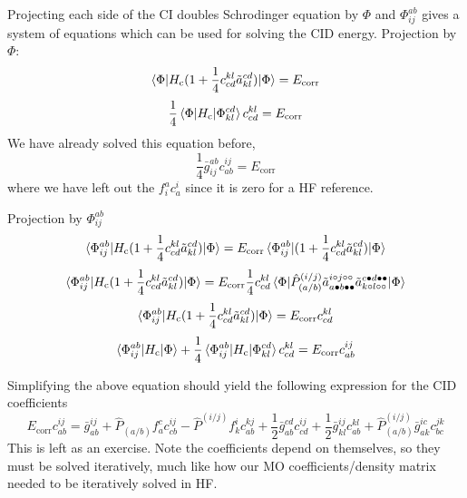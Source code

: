 \documentclass{article}
\newcommand{\h}{\circ}
\newcommand{\p}{\bullet}
\newcommand{\Ecorr}{E_{\mathrm{corr}}}
\newcommand{\Hc}{H_{\mathrm{c}}}
\begin{document}
Projecting each side of the CI doubles Schrodinger equation by $\Phi$ and $\Phi_{ij}^{ab}$ gives a system of equations 
which can be used for solving the CID energy.
Projection by $\Phi$:
\[\braket{\Phi |\Hc (1 + \frac{1}{4} c_{cd}^{kl} \tilde{a}_{kl}^{cd})| \Phi} = \Ecorr \]
\[ \frac{1}{4} \braket{\Phi |\Hc|\Phi_{kl}^{cd}} c_{cd}^{kl} = \Ecorr \]
We have already solved this equation before,
\[ \frac{1}{4} \bar{g}_{ij}^{ab} c_{ab}^{ij} = \Ecorr \]
where we have left out the $f_i^a c_a^i$ since it is zero for a HF reference.

Projection by $\Phi_{ij}^{ab}$
\[\braket{\Phi_{ij}^{ab} |\Hc (1 + \frac{1}{4} c_{cd}^{kl} \tilde{a}_{kl}^{cd})| \Phi} = \Ecorr \braket{\Phi_{ij}^{ab}| (1 + \frac{1}{4} c_{cd}^{kl} \tilde{a}_{kl}^{cd}) | \Phi} \]
\[\braket{\Phi_{ij}^{ab} |\Hc (1 + \frac{1}{4} c_{cd}^{kl} \tilde{a}_{kl}^{cd})| \Phi} 
          =  \Ecorr \frac{1}{4} c_{cd}^{kl} \braket{\Phi| \hat{P}_{(a/b)}^{(i/j)} \tilde{a}_{a \p b \p \p}^{i \h j \h \h}  \tilde{a}_{k \h l \h \h}^{c \p d \p \p} | \Phi} \]
\[\braket{\Phi_{ij}^{ab} |\Hc (1 + \frac{1}{4} c_{cd}^{kl} \tilde{a}_{kl}^{cd})| \Phi} 
          =  \Ecorr c_{cd}^{kl} \]
\[\braket{\Phi_{ij}^{ab} |\Hc | \Phi } + \frac{1}{4} \braket{\Phi_{ij}^{ab}| \Hc | \Phi_{kl}^{cd}} c_{cd}^{kl}
          =  \Ecorr c_{ab}^{ij} \]


Simplifying the above equation should yield the following expression for the
CID coefficients 
\[  \Ecorr c_{ab}^{ij} = \bar{g}_{ab}^{ij} + \hat{P}_{(a/b)} f_a^c c_{cb}^{ij} - \hat{P}^{(i/j)} f_k^i c_{ab}^{kj}
 + \frac{1}{2} \bar{g}_{ab}^{cd} c_{cd}^{ij} + \frac{1}{2} \bar{g}_{kl}^{ij} c_{ab}^{kl} +
  \hat{P}^{(i/j)}_{(a/b)} \bar{g}_{ak}^{ic} c_{bc}^{jk}
\]
This is left as an exercise. 
Note the coefficients depend on themselves, so they must be solved iteratively,
much like how our MO coefficients/density matrix needed to be iteratively solved in HF.
\end{document}
